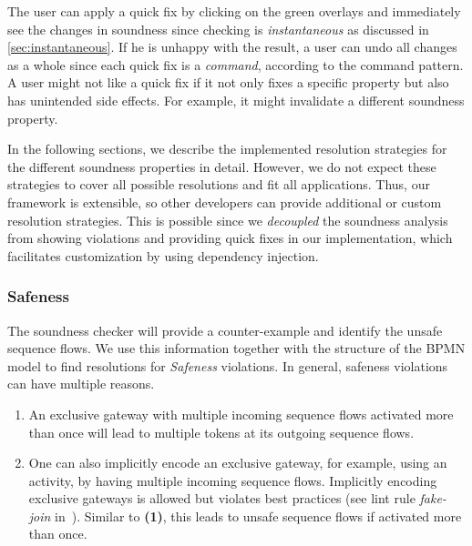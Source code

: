 \documentclass[runningheads]{llncs}
\begin{document}
The user can apply a quick fix by clicking on the green overlays and immediately see the changes in soundness since checking is \textit{instantaneous} as discussed in \autoref{sec:instantaneous}.
If he is unhappy with the result, a user can undo all changes as a whole since each quick fix is a \textit{command}, according to the command pattern.
A user might not like a quick fix if it not only fixes a specific property but also has unintended side effects.
For example, it might invalidate a different soundness property.

In the following sections, we describe the implemented resolution strategies for the different soundness properties in detail.
However, we do not expect these strategies to cover all possible resolutions and fit all applications.
Thus, our framework is extensible, so other developers can provide additional or custom resolution strategies.
This is possible since we \textit{decoupled} the soundness analysis from showing violations and providing quick fixes in our implementation, which facilitates customization by using dependency injection.

\subsubsection{Safeness} \label{subsec:safeness}
The soundness checker will provide a counter-example and identify the unsafe sequence flows.
We use this information together with the structure of the BPMN model to find resolutions for \textit{Safeness} violations.
In general, safeness violations can have multiple reasons.

\begin{enumerate}
	\item An exclusive gateway with multiple incoming sequence flows activated more than once will lead to multiple tokens at its outgoing sequence flows.
	\item One can also implicitly encode an exclusive gateway, for example, using an activity, by having multiple incoming sequence flows.
	Implicitly encoding exclusive gateways is allowed but violates best practices (see lint rule \textit{fake-join} in~\cite{camundaservicesgmbhBpmnlint2024}).
	Similar to \textbf{(1)}, this leads to unsafe sequence flows if activated more than once.
\end{enumerate}
\end{document}
